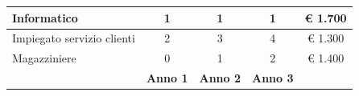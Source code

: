 \documentclass[12pt, a4paper]{article}
\begin{document}
\begin{longtable}{lcccc}
    \multicolumn{1}{|l|}{Informatico}                                                                                     & \multicolumn{1}{c|}{1}                                                                                                     & \multicolumn{1}{c|}{1}                                                                                                     & \multicolumn{1}{c|}{1}                                                                                                     & \multicolumn{1}{c|}{€ 1.700}                                                                                      \\ \hline
    \multicolumn{1}{|l|}{Impiegato servizio clienti}                                                                      & \multicolumn{1}{c|}{2}                                                                                                     & \multicolumn{1}{c|}{3}                                                                                                     & \multicolumn{1}{c|}{4}                                                                                                     & \multicolumn{1}{c|}{€ 1.300}                                                                                      \\ \hline
    \multicolumn{1}{|l|}{Magazziniere}                                                                                    & \multicolumn{1}{c|}{0}                                                                                                     & \multicolumn{1}{c|}{1}                                                                                                     & \multicolumn{1}{c|}{2}                                                                                                     & \multicolumn{1}{c|}{€ 1.400}                                                                                      \\ \hline
    \multicolumn{1}{|l|}{\cellcolor[HTML]{CBCEFB}}                                                                        & \multicolumn{1}{c|}{\cellcolor[HTML]{CBCEFB}\textbf{Anno 1}}                                                               & \multicolumn{1}{c|}{\cellcolor[HTML]{CBCEFB}\textbf{Anno 2}}                                                               & \multicolumn{1}{c|}{\cellcolor[HTML]{CBCEFB}\textbf{Anno 3}}                                                               &                                                                                                                   \\ \cline{2-4}

\end{longtable}
\end{document}
